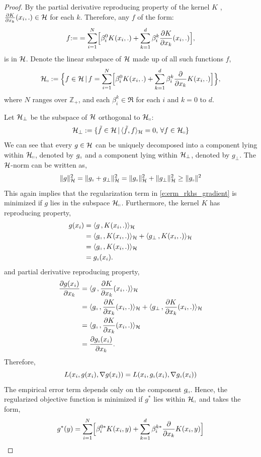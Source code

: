 \begin{proof}
By the partial derivative reproducing property of the kernel $K$ \cite[Theorem 1]{zho08},  $\frac{\partial K}{\partial x_k}(x_i,.) \in {\cal H}$ for each $k$.
Therefore, any $f$ of the form:
\[
f \mathbin{:=} =  \sum_{i=1}^N  \Bigl[
\beta_i^{0}  K(x_i, .)   +  \sum_{k =1}^d  \beta_i^{k} \frac{\partial K}{\partial x_k}  (x_i, .) \Bigr],
\]
is in ${\cal H}$. 	
Denote the linear subspace of ${\cal H}$ made up of all such functions $f$,
\[
{\cal H}_\shortparallel := \Bigl\{f \in {\cal H}\, |\, f = \sum_{i=1}^N \Bigl[ \beta^0_i K(x_i,.) + \sum_{k=1}^d \beta_i^k \frac{\partial }{\partial x_k} K(x_i, .)\Bigr]\Bigr\},
\]
where $N$ ranges over $\mathbb{Z}_+$, and  each $\beta_i^k \in \Re$ for each $i$ and $k = 0$ to $d$.

Let ${\cal H}_{\perp}$ be the subspace of ${\cal H}$ orthogonal to ${\cal H}_\shortparallel$:
\[
{\cal H}_\perp : = \{ \tilde f \in {\cal H}\,| \, \langle \tilde f , f \rangle_{\cal H} = 0 ,\, \forall f \in {\cal H}_\shortparallel \}
\]
We can see that every $g \in {\cal H}$ can be uniquely decomposed into a component lying within ${\cal H}_\shortparallel$, denoted by $g_\shortparallel$ and a component lying within ${\cal H}_\perp$, denoted by $g_\perp$.
The ${\cal H}$-norm can be written as,
\[
\|g\|^2_{\cal H} = \|g_\shortparallel + g_\perp\|^2_{\cal H} = \|g_\shortparallel\|^2_{\cal H} + \|g_\perp\|^2_{\cal H} \geq \|g_\shortparallel\|^2
\]
This again implies that the regularization term in \eqref{e:erm_rkhs_gradient} is minimized if $g$ lies in the subspace ${\cal H}_\shortparallel$. Furthermore, the kernel $K$ has reproducing property,
\[
\begin{aligned}
g(x_i) & =  \langle g \, , K(x_i,.) \rangle_{\cal H}\\
&  = \langle g_\shortparallel\, , K(x_i,.) \rangle_{\cal H} + \langle g_\perp \, , K(x_i,.) \rangle_{\cal H} \\
&  = \langle g_\shortparallel\, , K(x_i,.) \rangle_{\cal H} \\
&  = g_\shortparallel(x_i).
\end{aligned}
\]
and partial derivative reproducing property,
\[
\begin{aligned}
\frac{\partial g(x_i)}{\partial x_k} & =  \langle g \, , \frac{\partial K}{\partial x_k} (x_i,.) \rangle_{\cal H}\\
&  = \langle g_\shortparallel\, , \frac{\partial K}{\partial x_k} (x_i,.) \rangle_{\cal H} + \langle g_\perp \, ,\frac{\partial K}{\partial x_k} (x_i,.) \rangle_{\cal H} \\
&  = \langle g_\shortparallel\, , \frac{\partial K}{\partial x_k} (x_i,.) \rangle_{\cal H} \\
&  = \frac{\partial g_\shortparallel(x_i) }{\partial x_k}.
\end{aligned}
\]
Therefore,
\[
L(x_i, g(x_i),\nabla g(x_i)) = L(x_i, g_\shortparallel(x_i),\nabla g_\shortparallel(x_i))
\]
The empirical error term depends only on the component $g_\shortparallel$. Hence, the regularized objective function is minimized if $g^*$ lies within ${\cal H}_\shortparallel$ and takes the form,
\[
g^*(y) = \sum_{i=1}^N  \Bigl[ \beta_i^{0*}  K(x_i, y)   +  \sum_{k =1}^d  \beta_i^{k*} \frac{\partial}{\partial x_k}  K(x_i, y) \Bigr]
\]
\end{proof}

